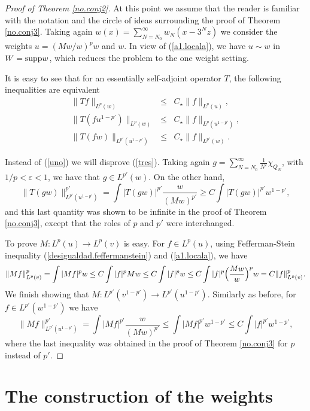 \documentclass[11pt]{amsart}
\theoremstyle{definition}
\begin{document}
\begin{proof}[Proof of Theorem \ref{no.conj2}]
At this point we assume that the reader is familiar with the notation and the circle of ideas surrounding the proof of Theorem \ref{no.conj3}. Taking again $w(x)=\sum_{N=N_0}^\infty w_N(x-3^Nz)$ we consider the weights $u=(Mw/w)^pw$ and $w$. In view of (\ref{a1.locala}), we have $u\sim w$ in $W={\mathop{\mbox{\normalfont supp}}\nolimits} w$, which  reduces the problem to the one weight setting.

\bigskip

It is easy to see that for an essentially self-adjoint operator $T$, the following inequalities are equivalent
\begin{eqnarray}\label{acotacion.normal}
\|Tf\|_{L^p(w)}&\leq& C_\star \|f\|_{L^p(u)},\label{uno}\\
\|T(fu^{1-p'})\|_{L^p(w)} &\leq& C_\star \|f\|_{L^p(u^{1-p'})},\nonumber\\
\|T(fw)\|_{L^{p'}(u^{1-p'})}&\leq& C_\star \|f\|_{L^{p'}(w)}.\label{tres}
\end{eqnarray}

\bigskip

Instead of (\ref{uno}) we will disprove (\ref{tres}). Taking again $g=\sum_{N=N_0}^\infty\frac1{N^{\varepsilon}} \chi_{Q_N}$, with $1/p<{\varepsilon}<1$, we have that $g\in L^{p'}(w)$. On the other hand,  
\[
\|T(gw)\|_{L^{p'}(u^{1-p'})}^{p'}=\int |T(gw)|^{p'} \frac{w}{(Mw)^{p'}} \geq C\int |T(gw)|^{p'} w^{1-p'},
\]
and this last quantity was shown to be infinite in the proof of Theorem \ref{no.conj3}, except that the roles of $p$ and $p'$ were interchanged.

\bigskip

To prove $M:L^p(u)\rightarrow L^p(v)$ is easy. For $f\in L^p(u)$, using Fefferman-Stein inequality (\ref{desigualdad.feffermanstein}) and (\ref{a1.locala}), we have
\[
\|Mf\|_{L^p(v)}^p=\int |Mf|^p w \leq C \int |f|^p Mw \leq C \int |f|^pw \leq C\int |f|^p \Bigl(\frac{Mw}{w}\Bigl)^p w = C\|f\|_{L^p(v)}^p.
\]
We finish showing that $M:L^{p'}(v^{1-p'})\rightarrow L^{p'}(u^{1-p'})$. Similarly as before, for $f\in L^{p'}(w^{1-p'})$ we have
\[
\|Mf\|_{L^{p'}(u^{1-p'})}^{p'}=\int |Mf|^{p'} \frac{w}{(Mw)^{p'}} \leq \int |Mf|^{p'} w^{1-p'} \leq C\int |f|^{p'} w^{1-p'},
\]
where the last inequality was obtained in the proof of Theorem \ref{no.conj3} for $p$ instead of $p'$.
\end{proof}

\bigskip

\section{The construction of the weights}
\end{document}

